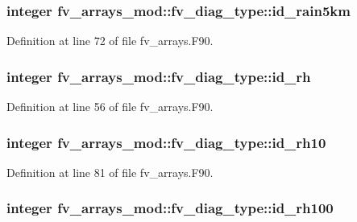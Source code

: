 \subsubsection[{id\-\_\-rain5km}]{\setlength{\rightskip}{0pt plus 5cm}integer fv\-\_\-arrays\-\_\-mod\-::fv\-\_\-diag\-\_\-type\-::id\-\_\-rain5km}\label{structfv__arrays__mod_1_1fv__diag__type_ae7c4203f1cc15c9eeb980725bfca9470}


Definition at line 72 of file fv\-\_\-arrays.\-F90.

\subsubsection[{id\-\_\-rh}]{\setlength{\rightskip}{0pt plus 5cm}integer fv\-\_\-arrays\-\_\-mod\-::fv\-\_\-diag\-\_\-type\-::id\-\_\-rh}\label{structfv__arrays__mod_1_1fv__diag__type_ac1d30d4c11ee0613ad97da33cc0ca3b5}


Definition at line 56 of file fv\-\_\-arrays.\-F90.

\subsubsection[{id\-\_\-rh10}]{\setlength{\rightskip}{0pt plus 5cm}integer fv\-\_\-arrays\-\_\-mod\-::fv\-\_\-diag\-\_\-type\-::id\-\_\-rh10}\label{structfv__arrays__mod_1_1fv__diag__type_a2c527a8bd28698419f9b6b4416fe75b3}


Definition at line 81 of file fv\-\_\-arrays.\-F90.

\subsubsection[{id\-\_\-rh100}]{\setlength{\rightskip}{0pt plus 5cm}integer fv\-\_\-arrays\-\_\-mod\-::fv\-\_\-diag\-\_\-type\-::id\-\_\-rh100}\label{structfv__arrays__mod_1_1fv__diag__type_a9f86116f4ee412db01c782624f5cadc0}


